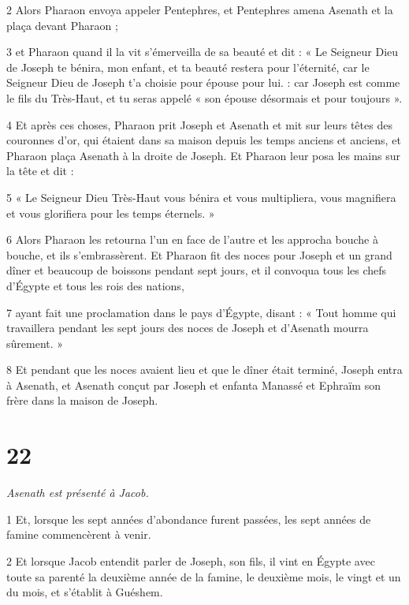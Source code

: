 \par 2 Alors Pharaon envoya appeler Pentephres, et Pentephres amena Asenath et la plaça devant Pharaon ;

\par 3 et Pharaon quand il la vit s'émerveilla de sa beauté et dit : « Le Seigneur Dieu de Joseph te bénira, mon enfant, et ta beauté restera pour l'éternité, car le Seigneur Dieu de Joseph t'a choisie pour épouse pour lui. : car Joseph est comme le fils du Très-Haut, et tu seras appelé « son épouse désormais et pour toujours ».

\par 4 Et après ces choses, Pharaon prit Joseph et Asenath et mit sur leurs têtes des couronnes d'or, qui étaient dans sa maison depuis les temps anciens et anciens, et Pharaon plaça Asenath à la droite de Joseph. Et Pharaon leur posa les mains sur la tête et dit :

\par 5 « Le Seigneur Dieu Très-Haut vous bénira et vous multipliera, vous magnifiera et vous glorifiera pour les temps éternels. »

\par 6 Alors Pharaon les retourna l'un en face de l'autre et les approcha bouche à bouche, et ils s'embrassèrent. Et Pharaon fit des noces pour Joseph et un grand dîner et beaucoup de boissons pendant sept jours, et il convoqua tous les chefs d'Égypte et tous les rois des nations,

\par 7 ayant fait une proclamation dans le pays d'Égypte, disant : « Tout homme qui travaillera pendant les sept jours des noces de Joseph et d'Asenath mourra sûrement. »

\par 8 Et pendant que les noces avaient lieu et que le dîner était terminé, Joseph entra à Asenath, et Asenath conçut par Joseph et enfanta Manassé et Ephraïm son frère dans la maison de Joseph.

\chapter{22}

\par \textit{Asenath est présenté à Jacob.}


\par 1 Et, lorsque les sept années d'abondance furent passées, les sept années de famine commencèrent à venir.

\par 2 Et lorsque Jacob entendit parler de Joseph, son fils, il vint en Égypte avec toute sa parenté la deuxième année de la famine, le deuxième mois, le vingt et un du mois, et s'établit à Guéshem.

